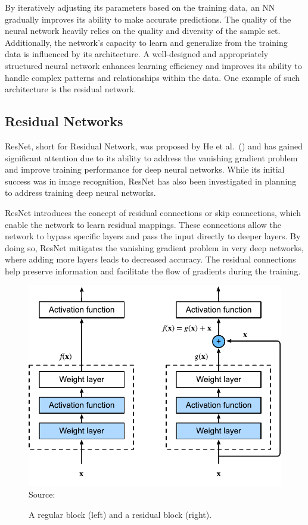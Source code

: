 By iteratively adjusting its parameters based on the training data, an NN gradually improves its ability to make accurate predictions. The quality of the neural network heavily relies on the quality and diversity of the sample set. Additionally, the network's capacity to learn and generalize from the training data is influenced by its architecture. A well-designed and appropriately structured neural network enhances learning efficiency and improves its ability to handle complex patterns and relationships within the data. One example of such architecture is the residual network.

\subsection{Residual Networks}
\label{sec:background_resnets}

ResNet, short for Residual Network, was proposed by He et al.~(\citeyear{He.etal/2016}) and has gained significant attention due to its ability to address the vanishing gradient problem~\cite{Hochreiter/1998} and improve training performance for deep neural networks. While its initial success was in image recognition, ResNet has also been investigated in planning~\cite{Agostinelli.etal/2019,Ferber.etal/2022} to address training deep neural networks.

ResNet introduces the concept of residual connections or skip connections, which enable the network to learn residual mappings. These connections allow the network to bypass specific layers and pass the input directly to deeper layers. By doing so, ResNet mitigates the vanishing gradient problem in very deep networks, where adding more layers leads to decreased accuracy. The residual connections help preserve information and facilitate the flow of gradients during the training.

\begin{figure}[t]
    \caption[A regular block and a residual block.]{A regular block (left) and a residual block (right).}
    \label{fig:residual_block}
    \addvspace{\baselineskip}
    \centering
    \includegraphics[width=0.75\linewidth]{figures/residual_block.pdf} \\
    Source:~\cite{Zhang.etal/2021}
\end{figure}

